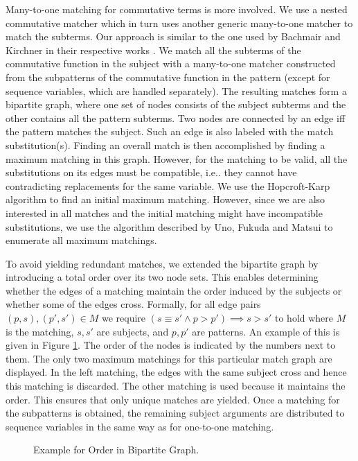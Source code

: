 \documentclass[conference,compsoc]{IEEEtran}
\makeatletter
\DeclareRobustCommand\onedot{\futurelet\@let@token\@onedot}
\def\@onedot{\ifx\@let@token.\else.\null\fi\xspace}
\def\ie{{i.e}\onedot} \def\Ie{{I.e}\onedot}
\makeatother
\begin{document}
Many-to-one matching for commutative terms is more involved.
We use a nested commutative matcher which in turn uses another generic many-to-one matcher to match the subterms.
Our approach is similar to the one used by Bachmair and Kirchner in their respective works \cite{Bachmair1995,Kirchner2001}.
We match all the subterms of the commutative function in the subject with a many-to-one matcher constructed from the
subpatterns of the commutative function in the pattern (except for sequence variables, which are handled separately).
The resulting matches form a bipartite graph, where one set of nodes consists of the subject subterms and the other contains all the pattern subterms.
Two nodes are connected by an edge iff the pattern matches the subject.
Such an edge is also labeled with the match substitution(s).
Finding an overall match is then accomplished by finding a maximum matching in this graph.
However, for the matching to be valid, all the substitutions on its edges must be compatible,
\ie they cannot have contradicting replacements for the same variable.
We use the Hopcroft-Karp algorithm \cite{Hopcroft1973} to find an initial maximum matching.
However, since we are also interested in all matches and the initial matching might have incompatible substitutions,
we use the algorithm described by Uno, Fukuda and Matsui \cite{Fukuda1994,Uno1997} to enumerate all maximum matchings.

To avoid yielding redundant matches, we extended the bipartite graph by introducing a total order over its two node sets.
This enables determining whether the edges of a matching maintain the order induced by the subjects or whether some of the edges \textquotedbl{}cross\textquotedbl{}.
Formally, for all edge pairs $(p, s), (p', s') \in M$ we require $(s \equiv s' \wedge p > p') \implies s > s'$
to hold where $M$ is the matching, $s, s'$ are subjects, and $p, p'$ are patterns.
An example of this is given in Figure \ref{fig:bipartite2}.
The order of the nodes is indicated by the numbers next to them.
The only two maximum matchings for this particular match graph are displayed.
In the left matching, the edges with the same subject cross and hence this matching is discarded.
The other matching is used because it maintains the order.
This ensures that only unique matches are yielded.
Once a matching for the subpatterns is obtained, the remaining subject arguments are
distributed to sequence variables in the same way as for one-to-one matching.\begin{figure}[]\noindent{}
\caption{Example for Order in Bipartite Graph. \label{fig:bipartite2}}
\end{figure}
\end{document}
